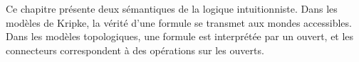 \documentclass[../../../include/open-logic-chapter]{subfiles}
\begin{document}

Ce chapitre présente deux sémantiques de la logique intuitionniste.
Dans les modèles de Kripke, la vérité d'une formule se transmet aux
mondes accessibles. Dans les modèles topologiques, une formule est
interprétée par un ouvert, et les connecteurs correspondent à des
opérations sur les ouverts.


\OLEndChapterHook
\end{document}
